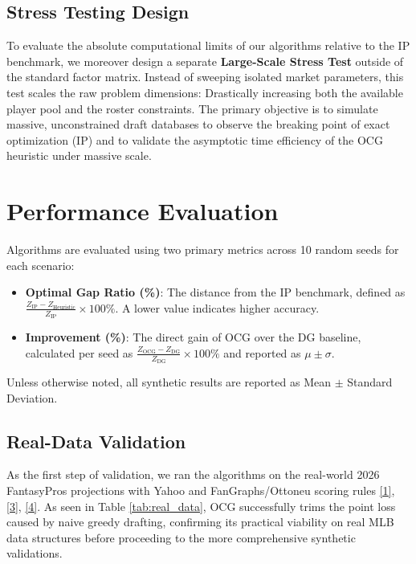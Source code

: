 \documentclass[11pt,a4paper]{article}
\begin{document}
\subsection{Stress Testing Design}

To evaluate the absolute computational limits of our algorithms relative to the IP benchmark, we moreover design a separate \textbf{Large-Scale Stress Test} outside of the standard factor matrix. Instead of sweeping isolated market parameters, this test scales the raw problem dimensions: Drastically increasing both the available player pool and the roster constraints. The primary objective is to simulate massive, unconstrained draft databases to observe the breaking point of exact optimization (IP) and to validate the asymptotic time efficiency of the OCG heuristic under massive scale.

\section{Performance Evaluation}

Algorithms are evaluated using two primary metrics across 10 random seeds for each scenario:
\begin{itemize}[leftmargin=1.5em]
    \item \textbf{Optimal Gap Ratio (\%)}: The distance from the IP benchmark, defined as $\frac{Z_{\text{IP}} - Z_{\text{Heuristic}}}{Z_{\text{IP}}} \times 100\%$. A lower value indicates higher accuracy.
    \item \textbf{Improvement (\%)}: The direct gain of OCG over the DG baseline, calculated per seed as $\frac{Z_{\text{OCG}} - Z_{\text{DG}}}{Z_{\text{DG}}} \times 100\%$ and reported as $\mu \pm \sigma$.
\end{itemize}
Unless otherwise noted, all synthetic results are reported as Mean $\pm$ Standard Deviation.

\subsection{Real-Data Validation}

As the first step of validation, we ran the algorithms on the real-world 2026 FantasyPros projections with Yahoo and FanGraphs/Ottoneu scoring rules \hyperref[ref:fantasypros-proj]{[1]}, \hyperref[ref:yahoo-scoring]{[3]}, \hyperref[ref:fangraphs-scoring]{[4]}. As seen in Table \ref{tab:real_data}, OCG successfully trims the point loss caused by naive greedy drafting, confirming its practical viability on real MLB data structures before proceeding to the more comprehensive synthetic validations.
\end{document}
